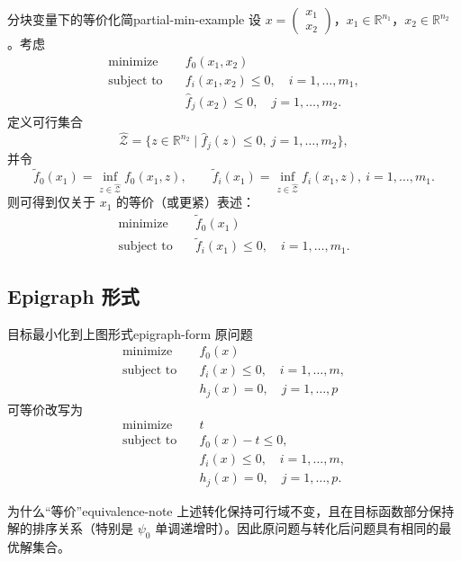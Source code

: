 \documentclass[11pt,a4paper]{article}
\begin{document}
\begin{example}{分块变量下的等价化简}{partial-min-example}
设 $x=\begin{pmatrix}x_1\\x_2\end{pmatrix}$，$x_1\in\mathbb R^{n_1}$，$x_2\in\mathbb R^{n_2}$。考虑
\[
\begin{aligned}
\text{minimize}\quad & f_0(x_1,x_2)\\
\text{subject to}\quad & f_i(x_1,x_2)\le0,\quad i=1,\dots,m_1,\\
& \hat f_j(x_2)\le0,\quad j=1,\dots,m_2.
\end{aligned}
\]
定义可行集合
\[
\hat{\mathcal Z}=\{z\in\mathbb R^{n_2}\mid \hat f_j(z)\le0,\ j=1,\dots,m_2\},
\]
并令
\[
\tilde f_0(x_1)=\inf_{z\in\hat{\mathcal Z}} f_0(x_1,z),\qquad
\tilde f_i(x_1)=\inf_{z\in\hat{\mathcal Z}} f_i(x_1,z),\ i=1,\dots,m_1.
\]
则可得到仅关于 $x_1$ 的等价（或更紧）表述：
\[
\begin{aligned}
\text{minimize}\quad & \tilde f_0(x_1)\\
\text{subject to}\quad & \tilde f_i(x_1)\le0,\quad i=1,\dots,m_1.
\end{aligned}
\]
\end{example}

\subsection{Epigraph 形式}
\begin{definition}{目标最小化到上图形式}{epigraph-form}
原问题
\[
\begin{aligned}
\text{minimize}\quad & f_0(x)\\
\text{subject to}\quad & f_i(x)\le0,\quad i=1,\dots,m,\\
& h_j(x)=0,\quad j=1,\dots,p
\end{aligned}
\]
可等价改写为
\[
\begin{aligned}
\text{minimize}\quad & t\\
\text{subject to}\quad & f_0(x)-t\le0,\\
& f_i(x)\le0,\quad i=1,\dots,m,\\
& h_j(x)=0,\quad j=1,\dots,p.
\end{aligned}
\]
\end{definition}

\begin{remark}{为什么“等价”}{equivalence-note}
上述转化保持可行域不变，且在目标函数部分保持解的排序关系（特别是 $\psi_0$ 单调递增时）。因此原问题与转化后问题具有相同的最优解集合。
\end{remark}
\end{document}
